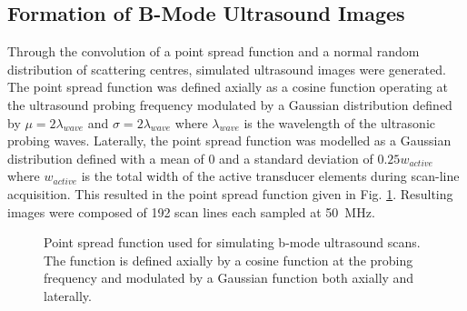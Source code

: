 		\subsection{Formation of B-Mode Ultrasound Images}
			Through the convolution of a point spread function and a normal random distribution of scattering centres, simulated ultrasound images were generated. The point spread function was defined axially as a cosine function operating at the ultrasound probing frequency modulated by a Gaussian distribution defined by $\mu = 2\lambda_{wave}$ and $\sigma = 2\lambda_{wave}$ where $\lambda_{wave}$ is the wavelength of the ultrasonic probing waves. Laterally, the point spread function was modelled as a Gaussian distribution defined with a mean of 0 and a standard deviation of $0.25w_{active}$ where $w_{active}$ is the total width of the active transducer elements during scan-line acquisition.  This resulted in the point spread function given in Fig. \ref{fig:point_spread_function}. Resulting images were composed of 192 scan lines each sampled at \SI{50}{\MHz}.

			\begin{figure}[!htb]
				\centering
				\caption[Point spread function used for simulating b-mode ultrasound scans]{Point spread function used for simulating b-mode ultrasound scans. The function is defined axially by a cosine function at the probing frequency and modulated by a Gaussian function both axially and laterally.}
				\label{fig:point_spread_function}
			\end{figure}

